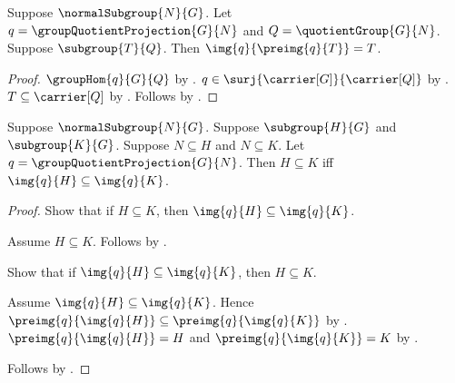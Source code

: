 \begin{theorem}\label{group_quotient_correspondence_image_preimage}
    Suppose $\normalSubgroup{N}{G}$.
    Let $q=\groupQuotientProjection{G}{N}$ and
        $Q=\quotientGroup{G}{N}$.
    Suppose $\subgroup{T}{Q}$.
    Then $\img{q}{\preimg{q}{T}}=T$.
\end{theorem}
\begin{proof}
    $\groupHom{q}{G}{Q}$ by
        .
    $q\in\surj{\carrier[G]}{\carrier[Q]}$ by
        .
    $T\subseteq\carrier[Q]$ by .
    Follows by .
\end{proof}

\begin{theorem}\label{group_quotient_correspondence_image_inclusion}
    Suppose $\normalSubgroup{N}{G}$.
    Suppose $\subgroup{H}{G}$ and $\subgroup{K}{G}$.
    Suppose $N\subseteq H$ and $N\subseteq K$.
    Let $q=\groupQuotientProjection{G}{N}$.
    Then $H\subseteq K$ iff $\img{q}{H}\subseteq\img{q}{K}$.
\end{theorem}
\begin{proof}
    Show that if $H\subseteq K$, then
        $\img{q}{H}\subseteq\img{q}{K}$.
    \begin{subproof}
        Assume $H\subseteq K$.
        Follows by .
    \end{subproof}
    Show that if $\img{q}{H}\subseteq\img{q}{K}$, then
        $H\subseteq K$.
    \begin{subproof}
        Assume $\img{q}{H}\subseteq\img{q}{K}$.
        Hence $\preimg{q}{\img{q}{H}}\subseteq
            \preimg{q}{\img{q}{K}}$ by .
        $\preimg{q}{\img{q}{H}}=H$ and
            $\preimg{q}{\img{q}{K}}=K$ by
            .
    \end{subproof}
    Follows by \auto.
\end{proof}

